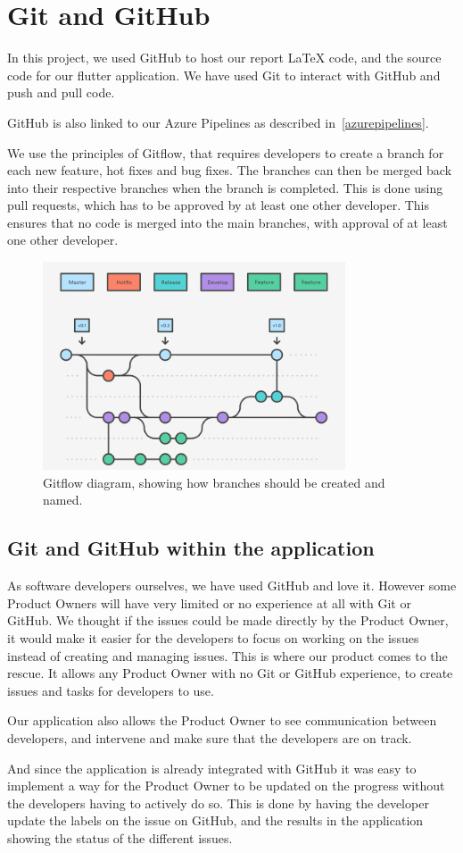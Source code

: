 \section{Git and GitHub}
In this project, we used GitHub to host our report LaTeX code, and the source code for our flutter application.
We have used Git to interact with GitHub and push and pull code. 

GitHub is also linked to our Azure Pipelines as described in~\autoref{azurepipelines}.

We use the principles of Gitflow, that requires developers to create a branch for each new feature, hot fixes and bug fixes. 
The branches can then be merged back into their respective branches when the branch is completed.
This is done using pull requests, which has to be approved by at least one other developer.
This ensures that no code is merged into the main branches, with approval of at least one other developer.

\begin{figure}[H]
    \centering
    \includegraphics[width=0.8\textwidth]{images/GitFlow.png}
    \caption{Gitflow diagram, showing how branches should be created and named.}
    \label{Gitflow}
\end{figure}

\subsection{Git and GitHub within the application}
As software developers ourselves, we have used GitHub and love it.
However some Product Owners will have very limited or no experience at all with Git or GitHub.
We thought if the issues could be made directly by the Product Owner, it would make it easier for the developers to focus on working on the issues instead of creating and managing issues. 
This is where our product comes to the rescue.
It allows any Product Owner with no Git or GitHub experience, to create issues and tasks for developers to use.

Our application also allows the Product Owner to see communication between developers, and intervene and make sure that the developers are on track.

And since the application is already integrated with GitHub it was easy to implement a way for the Product Owner to be updated on the progress without the developers having to actively do so. This is done by having the developer update the labels on the issue on GitHub, and the results in the application showing the status of the different issues. 